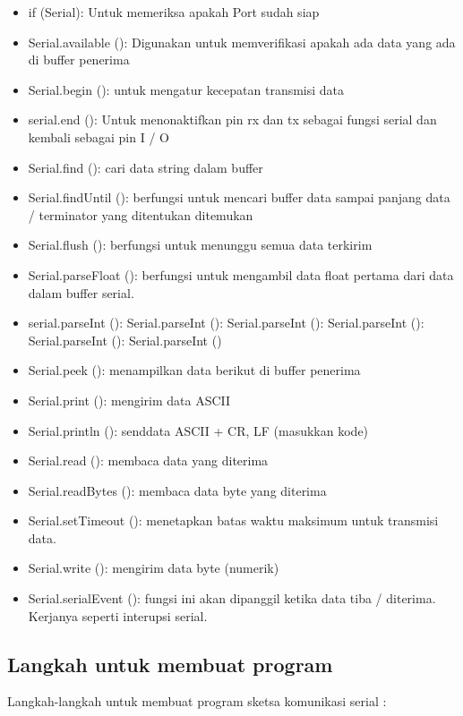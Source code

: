 \begin{itemize}
\item if (Serial): Untuk memeriksa apakah Port sudah siap
\item Serial.available (): Digunakan untuk memverifikasi apakah ada data yang ada di buffer penerima
\item Serial.begin (): untuk mengatur kecepatan transmisi data
\item serial.end (): Untuk menonaktifkan pin rx dan tx sebagai fungsi serial dan kembali sebagai pin I / O
\item Serial.find (): cari data string dalam buffer
\item Serial.findUntil (): berfungsi untuk mencari buffer data sampai panjang data / terminator yang ditentukan ditemukan
\item Serial.flush (): berfungsi untuk menunggu semua data terkirim
\item Serial.parseFloat (): berfungsi untuk mengambil data float pertama dari data dalam buffer serial.
\item serial.parseInt (): Serial.parseInt (): Serial.parseInt (): Serial.parseInt (): Serial.parseInt (): Serial.parseInt ()
\item Serial.peek (): menampilkan data berikut di buffer penerima
\item Serial.print (): mengirim data ASCII
\item Serial.println (): senddata ASCII + CR, LF (masukkan kode)
\item Serial.read (): membaca data yang diterima
\item Serial.readBytes (): membaca data byte yang diterima
\item Serial.setTimeout (): menetapkan batas waktu maksimum untuk transmisi data.
\item Serial.write (): mengirim data byte (numerik)
\item Serial.serialEvent (): fungsi ini akan dipanggil ketika data tiba / diterima. Kerjanya seperti interupsi serial.
\end{itemize}

\subsection {Langkah untuk membuat program}
Langkah-langkah untuk membuat program sketsa komunikasi serial :


